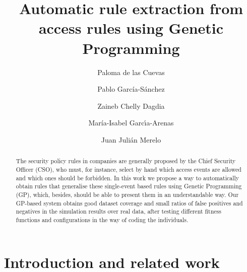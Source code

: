 \documentclass[runningheads]{llncs}
\begin{document}
%
\title{Automatic rule extraction from access rules using Genetic Programming}



%
%
 \author{Paloma de las Cuevas \and
 Pablo Garc\'ia-S\'anchez \and
 Zaineb Chelly Dagdia \and
 Mar\'ia-Isabel Garc\'{\i}a-Arenas \and
 Juan Juli\'an Merelo}

%
%
%
\maketitle              %
%
\begin{abstract}
The security policy rules in companies are generally proposed by the
Chief Security Officer (CSO), who must, for instance, select by hand
which access events are allowed and which ones should be forbidden. In
this work we propose a way to automatically obtain rules that
generalise these single-event based rules using Genetic Programming
(GP), which, besides, should be able to present them in an
understandable way. Our GP-based system obtains good dataset coverage
and small ratios of false positives and negatives in the simulation
results over real data, after testing different fitness functions and
configurations in the way of coding the individuals.

\end{abstract}
%
%
%



\section{Introduction and related work}
\label{sec:intro}
\end{document}

